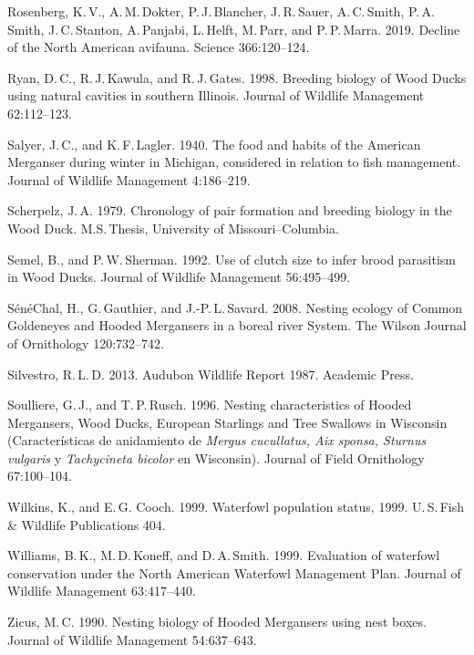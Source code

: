 \begin{hangparas}{2em}{1}
	Rosenberg, K.\,V., A.\,M.\,Dokter, P.\,J.\,Blancher, J.\,R.\,Sauer, A.\,C.\,Smith, P.\,A.\,Smith, J.\,C.\,Stanton, A.\,Panjabi, L.\,Helft, M.\,Parr, and P.\,P.\,Marra. 2019. Decline of the North American avifauna. Science 366:120–124. 
	
	Ryan, D.\,C., R.\,J.\,Kawula, and R.\,J.\,Gates. 1998. Breeding biology of Wood Ducks using natural cavities in southern Illinois. Journal of Wildlife Management 62:112–123. 
	
	Salyer, J.\,C., and K.\,F.\,Lagler. 1940. The food and habits of the American Merganser during winter in Michigan, considered in relation to fish management. Journal of Wildlife Management 4:186–219. 
	
	Scherpelz, J.\,A. 1979. Chronology of pair formation and breeding biology in the Wood Duck. M.S.\,Thesis, University of Missouri--Columbia. 
	
	Semel, B., and P.\,W.\,Sherman. 1992. Use of clutch size to infer brood parasitism in Wood Ducks. Journal of Wildlife Management 56:495–499. 
	
	SénéChal, H., G.\,Gauthier, and J.-P.\,L.\,Savard. 2008. Nesting ecology of Common Goldeneyes and Hooded Mergansers in a boreal river System. The Wilson Journal of Ornithology 120:732–742. 
	
	Silvestro, R.\,L.\,D. 2013. Audubon Wildlife Report 1987. Academic Press. 
	
	Soulliere, G.\,J., and T.\,P.\,Rusch. 1996. Nesting characteristics of Hooded Mergansers, Wood Ducks, European Starlings and Tree Swallows in Wisconsin (Características de anidamiento de \textit{Mergus cucullatus, Aix sponsa, Sturnus vulgaris} y \textit{Tachycineta bicolor} en Wisconsin). Journal of Field Ornithology 67:100–104. 
	
	Wilkins, K., and E.\,G. Cooch. 1999. Waterfowl population status, 1999. U.\,S.\,Fish \& Wildlife Publications 404. 
	
	Williams, B.\,K., M.\,D.\,Koneff, and D.\,A.\,Smith. 1999. Evaluation of waterfowl conservation under the North American Waterfowl Management Plan. Journal of Wildlife Management 63:417–440. 
	
	Zicus, M.\,C. 1990. Nesting biology of Hooded Mergansers using nest boxes. Journal of Wildlife Management 54:637–643. 
	
\end{hangparas}